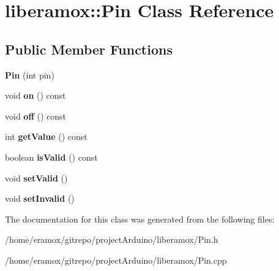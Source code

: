 \hypertarget{classliberamox_1_1Pin}{}\section{liberamox\+:\+:Pin Class Reference}
\label{classliberamox_1_1Pin}
\subsection*{Public Member Functions}
\begin{DoxyCompactItemize}
\item 
{\bfseries Pin} (int pin)\hypertarget{classliberamox_1_1Pin_abb503c4126b6d0d9cdb25f1f2e2d6f79}{}\label{classliberamox_1_1Pin_abb503c4126b6d0d9cdb25f1f2e2d6f79}

\item 
void {\bfseries on} () const \hypertarget{classliberamox_1_1Pin_a221dee279c637542274509aef028e96d}{}\label{classliberamox_1_1Pin_a221dee279c637542274509aef028e96d}

\item 
void {\bfseries off} () const \hypertarget{classliberamox_1_1Pin_a925e38096e1b000dcee10a431072f4a6}{}\label{classliberamox_1_1Pin_a925e38096e1b000dcee10a431072f4a6}

\item 
int {\bfseries get\+Value} () const \hypertarget{classliberamox_1_1Pin_ad7a9b544674f5264af56591366ab7f65}{}\label{classliberamox_1_1Pin_ad7a9b544674f5264af56591366ab7f65}

\item 
boolean {\bfseries is\+Valid} () const \hypertarget{classliberamox_1_1Pin_aa9b1533ed4df8771c28cd4bb42d80e29}{}\label{classliberamox_1_1Pin_aa9b1533ed4df8771c28cd4bb42d80e29}

\item 
void {\bfseries set\+Valid} ()\hypertarget{classliberamox_1_1Pin_a4aa3e215e0d546f9a0a1d33e2769d581}{}\label{classliberamox_1_1Pin_a4aa3e215e0d546f9a0a1d33e2769d581}

\item 
void {\bfseries set\+Invalid} ()\hypertarget{classliberamox_1_1Pin_a05ee0d794488706800cdb71b32262a31}{}\label{classliberamox_1_1Pin_a05ee0d794488706800cdb71b32262a31}

\end{DoxyCompactItemize}


The documentation for this class was generated from the following files\+:\begin{DoxyCompactItemize}
\item 
/home/eramox/gitrepo/project\+Arduino/liberamox/Pin.\+h\item 
/home/eramox/gitrepo/project\+Arduino/liberamox/Pin.\+cpp\end{DoxyCompactItemize}
